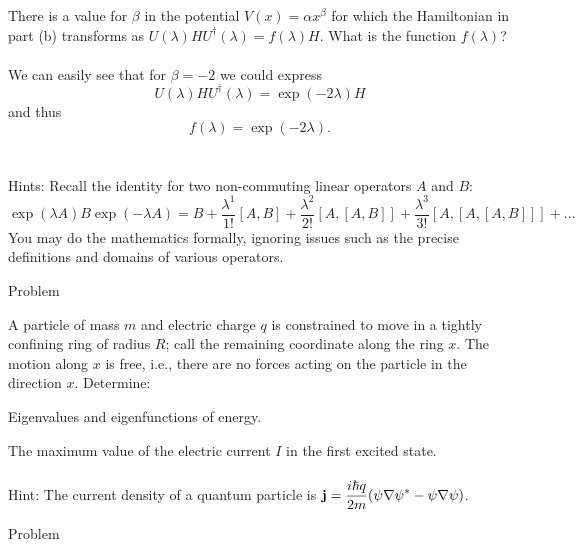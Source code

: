 \documentclass[11pt,letterpaper]{article}
\begin{document}
			\item
			There is a value for $\beta$ in the potential $V(x) = \alpha x^\beta$ for which the Hamiltonian in part (b) transforms as 
			$U(\lambda)HU^\dag(\lambda) = f(\lambda)H$. What is the function $f(\lambda)$?
			\\
			\\
			We can easily see that for $\beta = -2$ we could express
			\[
				U(\lambda)HU^\dag(\lambda) = \exp(-2\lambda)H
			\]
			and thus
			\[
				f(\lambda) = \exp(-2\lambda).
			\]
			\\
			\\
			Hints: Recall the identity for two non-commuting linear operators $A$ and $B$:
			\[
				\exp(\lambda A)B\exp(-\lambda A) = B+\frac{\lambda^1}{1!}[A,B]+\frac{\lambda^2}{2!}[A,[A,B]]+\frac{\lambda^3}{3!}
				[A,[A,[A,B]]]+...
			\]
			You may do the mathematics formally, ignoring issues such as the precise definitions and domains of various operators.
		\eenum
		\item
		Problem
		\benum
			\item
			
			\item
			\item
		\eenum
		\item
		A particle of mass $m$ and electric charge $q$ is constrained to move in a tightly confining ring of radius $R$; call the remaining 
		coordinate along the ring $x$. The motion along $x$ is free, i.e., there are no forces acting on the particle in the direction $x$.
		Determine:
		\benum
			\item
			Eigenvalues and eigenfunctions of energy.
			\item
			The maximum value of the electric current $I$ in the first excited state.
			\\
			\\
			Hint: The current density of a quantum particle is $\displaystyle\mathbf{j} = \frac{i\hbar q}{2m}(\psi\nabla\psi^*-\psi\nabla\psi)$.
		\eenum	
		\item
		Problem
		\benum
			\item
			
\end{document}
